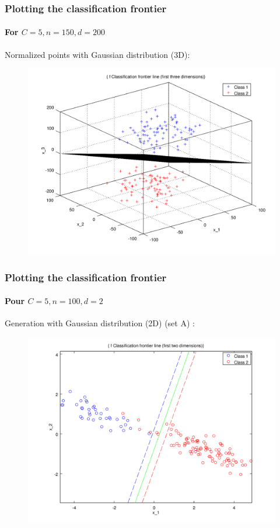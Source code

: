 \documentclass{beamer}
\begin{document}
\begin{frame}
\frametitle{Plotting the \textbf{classification frontier}}
\framesubtitle{For $C = 5, n = 150, d = 200$}

Normalized points with Gaussian distribution (3D):

         \begin{figure}
         \centering
         \includegraphics[scale=0.4]{images/plane4.png}
         \end{figure}

\end{frame}

\begin{frame}
\frametitle{Plotting the \textbf{classification frontier}}
\framesubtitle{Pour $C = 5, n = 100, d = 2$}

Generation with Gaussian distribution (2D) (set A) :

         \begin{figure}
         \centering
         \includegraphics[scale=0.4]{images/image1.png}
         \end{figure}

\end{frame}
\end{document}
